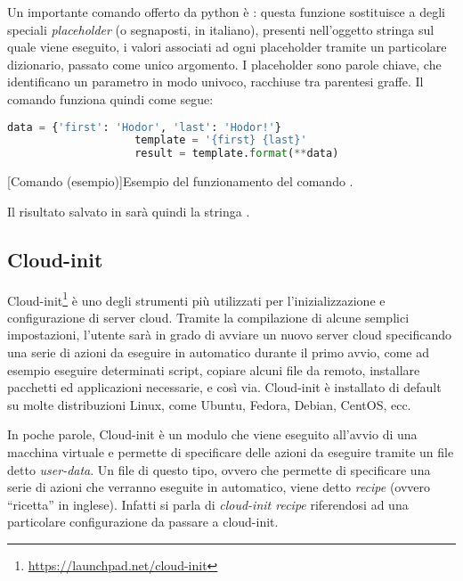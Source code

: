            Un importante comando offerto da python è : questa funzione sostituisce a degli speciali \textit{placeholder} (o segnaposti, in italiano), presenti nell'oggetto stringa sul quale viene eseguito, i valori associati ad ogni placeholder tramite un particolare dizionario, passato come unico argomento. I placeholder sono parole chiave, che identificano un parametro in modo univoco, racchiuse tra parentesi graffe. Il comando  funziona quindi come segue:
            
            \begin{center}
                \begin{lstlisting}[language=python, gobble=18]
                    data = {'first': 'Hodor', 'last': 'Hodor!'}
                    template = '{first} {last}'
                    result = template.format(**data)
                \end{lstlisting}
                \captionsetup{textformat=empty,labelformat=empty} \vspace{-2em}
                [Comando  (esempio)]{Esempio del funzionamento del comando .}
            \end{center}
            
            Il risultato salvato in  sarà quindi la stringa .
        
        \subsection{Cloud-init} \label{subsec:p;sl;cloud-init}
        
            Cloud-init\footnote{\url{https://launchpad.net/cloud-init}} è uno degli strumenti più utilizzati per l'inizializzazione e configurazione di server cloud. Tramite la compilazione di alcune semplici impostazioni, l'utente sarà in grado di avviare un nuovo server cloud specificando una serie di azioni da eseguire in automatico durante il primo avvio, come ad esempio eseguire determinati script, copiare alcuni file da remoto, installare pacchetti ed applicazioni necessarie, e così via. Cloud-init è installato di default su molte distribuzioni Linux, come Ubuntu, Fedora, Debian, CentOS, ecc. \cite{cloud-init:readthedocs}
            
            In poche parole, Cloud-init è un modulo che viene eseguito all'avvio di una macchina virtuale e permette di specificare delle azioni da eseguire tramite un file detto \textit{user-data}. Un file di questo tipo, ovvero che permette di specificare una serie di azioni che verranno eseguite in automatico, viene detto \textit{recipe} (ovvero ``ricetta'' in inglese). Infatti si parla di \textit{cloud-init recipe} riferendosi ad una particolare configurazione da passare a cloud-init.
            
